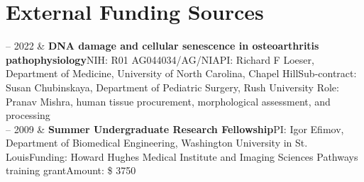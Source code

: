 \documentclass[10pt, letterpaper]{article}
\newcommand{\WASHU}{Washington University in St. Louis}
\newcommand{\RUSH}{Rush University}
\newcommand{\RUPEDS}{Department of Pediatric Surgery}
\newcommand{\Duration}[2]{\fontsize{9pt}{0}\selectfont #1 -- #2}
\newcommand{\Appointment}[4]{\textbf{#1}\newline  #2\newline  #3\newline  #4}
\begin{document}
\section{External Funding Sources}
\begin{EntriesTable}
  \Duration{2021}{2022}  &
  \Appointment{DNA damage and cellular senescence in osteoarthritis pathophysiology}
  {NIH: R01 AG044034/AG/NIA}
  {PI: Richard F Loeser, Department of Medicine, University of North Carolina, Chapel Hill}
  {Sub-contract: Susan Chubinskaya, {\RUPEDS}, {\RUSH}}
  {Role: Pranav Mishra, human tissue procurement, morphological assessment, and processing}
  \\
  \Duration{2009}{2009}  &
  \Appointment{Summer Undergraduate Research Fellowship}
  {PI: Igor Efimov, Department of Biomedical Engineering, {\WASHU}}
  {Funding: Howard Hughes Medical Institute and Imaging Sciences Pathways training grant}
  {Amount: \$ 3750}

\end{EntriesTable}



\end{document}
